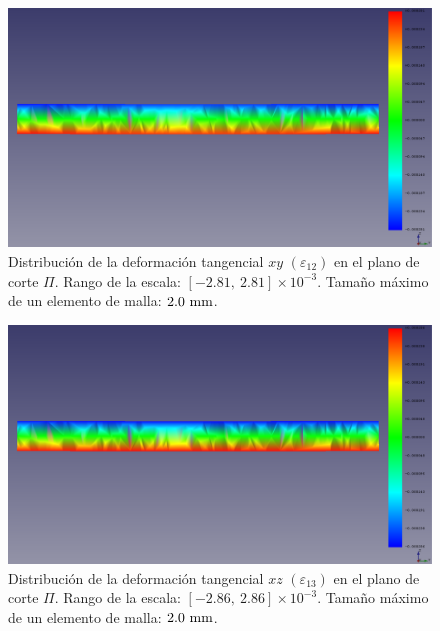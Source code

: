 \begin{figure}[H]
    \centering
    \includegraphics[width=\textwidth]{figures/resultados/strain_vector_y_20.pdf}
    \caption{Distribución de la deformación tangencial $xy$ $(\varepsilon_{12})$ en el plano de corte $\Pi$. Rango de la escala: $[-2.81, \ 2.81] \times 10^{-3}$. Tamaño máximo de un elemento de malla: $2.0 \ \milli\meter$.}
    \label{fig:strain_vector_y_20}
\end{figure}

\begin{figure}[H]
    \centering
    \includegraphics[width=\textwidth]{figures/resultados/strain_vector_z_20.pdf}
    \caption{Distribución de la deformación tangencial $xz$ $(\varepsilon_{13})$ en el plano de corte $\Pi$. Rango de la escala: $[-2.86, \ 2.86] \times 10^{-3}$. Tamaño máximo de un elemento de malla: $2.0 \ \milli\meter$.}
    \label{fig:strain_vector_z_20}
\end{figure}

